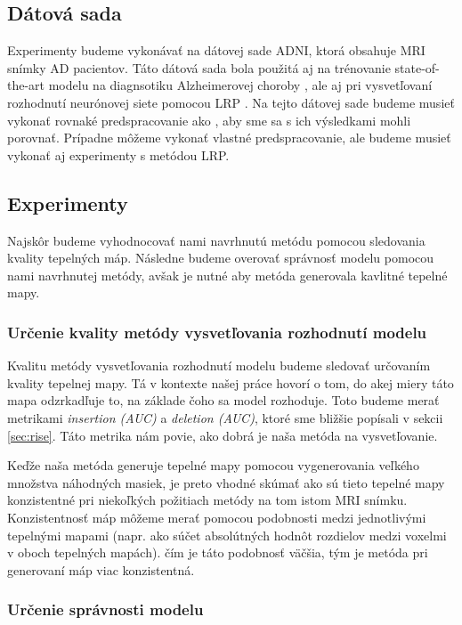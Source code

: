 \subsection{Dátová sada} Experimenty budeme vykonávať na dátovej sade ADNI, ktorá obsahuje MRI snímky AD pacientov. Táto dátová sada bola použitá aj na trénovanie state-of-the-art modelu na diagnsotiku Alzheimerovej choroby \cite{esmaeilzadeh2018end}, ale aj pri vysvetľovaní rozhodnutí neurónovej siete pomocou LRP \cite{bohle2019layer}. Na tejto dátovej sade budeme musieť vykonať rovnaké predspracovanie ako \citeauthor*{bohle2019layer}, aby sme sa s ich výsledkami mohli porovnať. Prípadne môžeme vykonať vlastné predspracovanie, ale budeme musieť vykonať aj experimenty s metódou LRP.

\subsection{Experimenty}

Najskôr budeme vyhodnocovať nami navrhnutú metódu pomocou sledovania kvality tepelných máp. Následne budeme overovať správnosť modelu pomocou nami navrhnutej metódy, avšak je nutné aby metóda generovala kavlitné tepelné mapy.

\subsubsection{Určenie kvality metódy vysvetľovania rozhodnutí modelu}

Kvalitu metódy vysvetľovania rozhodnutí modelu budeme sledovať určovaním kvality tepelnej mapy. Tá v kontexte našej práce hovorí o tom, do akej miery táto mapa odzrkadľuje to, na základe čoho sa model rozhoduje. Toto budeme merať metrikami \textit{insertion (AUC)} a \textit{deletion (AUC)}, ktoré sme bližšie popísali v sekcii \ref{sec:rise}. Táto metrika nám povie, ako dobrá je naša metóda na vysvetľovanie.

Keďže naša metóda generuje tepelné mapy pomocou vygenerovania veľkého množstva náhodných masiek, je preto vhodné skúmať ako sú tieto tepelné mapy konzistentné pri niekoľkých požitiach metódy na tom istom MRI snímku. Konzistentnosť máp môžeme merať pomocou podobnosti medzi jednotlivými tepelnými mapami (napr. ako súčet absolútných hodnôt rozdielov medzi voxelmi v oboch tepelných mapách). čím je táto podobnosť väčšia, tým je metóda pri generovaní máp viac konzistentná.

\subsubsection{Určenie správnosti modelu}


